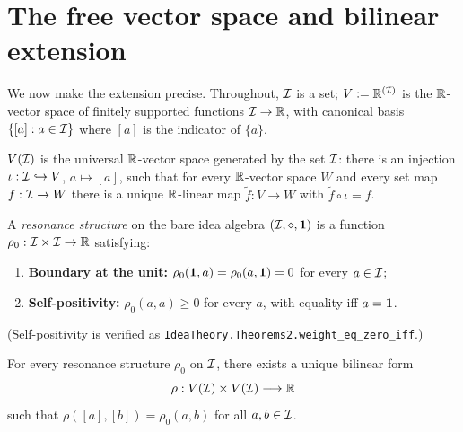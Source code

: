 \section{The free vector space and bilinear extension}\label{sec:free-vs}

We now make the extension precise. Throughout, $\mathcal{I}$ is a set;
$V:=\mathbb{R}^{(\mathcal{I})}$ is the $\mathbb{R}$-vector space of finitely supported
functions $\mathcal{I}\to\mathbb{R}$, with canonical basis $\{[a]:a\in\mathcal{I}\}$ where
$[a]$ is the indicator of $\{a\}$.

\begin{definition}\label{def:free-vs}
$V(\mathcal{I})$ is the universal $\mathbb{R}$-vector space generated by the set
$\mathcal{I}$: there is an injection $\iota:\mathcal{I}\hookrightarrow V$, $a\mapsto
[a]$, such that for every $\mathbb{R}$-vector space $W$ and every set map
$f:\mathcal{I}\to W$ there is a unique $\mathbb{R}$-linear map $\widetilde f:V\to W$
with $\widetilde f\circ\iota=f$.
\end{definition}

\begin{definition}\label{def:res-struct}
A \emph{resonance structure} on the bare idea algebra $(\mathcal{I},\mathbin{\diamond},\mathbf{1})$ is a
function $\rho_0:\mathcal{I}\times\mathcal{I}\to\mathbb{R}$ satisfying:
\begin{enumerate}
  \item \textbf{Boundary at the unit:} $\rho_0(\mathbf{1},a)=\rho_0(a,\mathbf{1})=0$
        for every $a\in\mathcal{I}$;
  \item \textbf{Self-positivity:} $\rho_0(a,a)\ge 0$ for every $a$, with
        equality iff $a=\mathbf{1}$.
\end{enumerate}
\end{definition}

\noindent (Self-positivity is verified as
\texttt{IdeaTheory.Theorems2.weight\_eq\_zero\_iff}.)

\begin{theorem}\label{thm:bilinear-extension}
For every resonance structure $\rho_0$ on $\mathcal{I}$, there exists a unique
bilinear form
\[
\rho:V(\mathcal{I})\times V(\mathcal{I})\longrightarrow \mathbb{R}
\]
such that $\rho([a],[b])=\rho_0(a,b)$ for all $a,b\in\mathcal{I}$.
\end{theorem}

